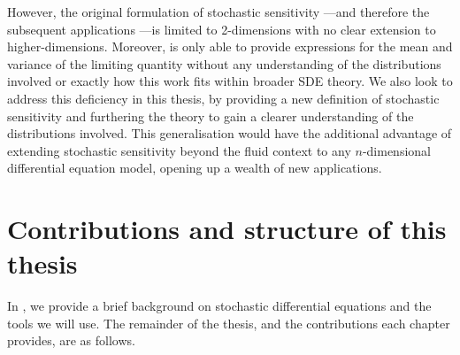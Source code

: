 However, the original formulation of stochastic sensitivity \citep{Balasuriya_2020_StochasticSensitivityComputable}---and therefore the subsequent applications \citep{Balasuriya_2020_UncertaintyFinitetimeLyapunov,BadzaEtAl_2023_HowSensitiveAre,FangOuellette_2021_AssessingInformationContent,FangEtAl_2020_DisentanglingResolutionPrecision}---is limited to 2-dimensions with no clear extension to higher-dimensions.
Moreover, \citet{Balasuriya_2020_StochasticSensitivityComputable} is only able to provide expressions for the mean and variance of the limiting quantity without any understanding of the distributions involved or exactly how this work fits within broader SDE theory.
We also look to address this deficiency in this thesis, by providing a new definition of stochastic sensitivity and furthering the theory to gain a clearer understanding of the distributions involved.
This generalisation would have the additional advantage of extending stochastic sensitivity beyond the fluid context to any \(n\)-dimensional differential equation model, opening up a wealth of new applications.


\section{Contributions and structure of this thesis}\label{sec:intro_structure}
In , we provide a brief background on stochastic differential equations and the tools we will use.
The remainder of the thesis, and the contributions each chapter provides, are as follows.

